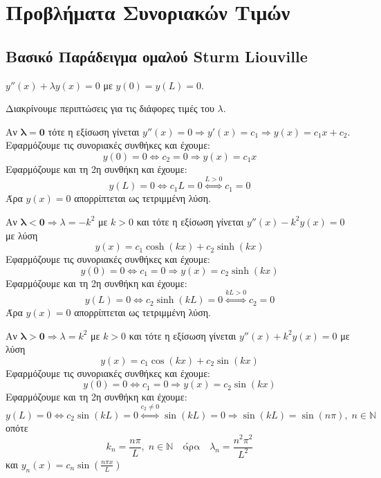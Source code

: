 



\geometry{top=1cm,margin=1cm}

\pagestyle{vangelis}
\everymath{\displaystyle}
\setcounter{chapter}{1}



\chapter*{Προβλήματα Συνοριακών Τιμών}

\section*{Βασικό Παράδειγμα ομαλού Sturm Liouville}


\begin{example}
  $ y''(x) + \lambda y(x)=0 $ με $ y(0)=y(L)=0 $.
\end{example}
\begin{solution}
  Διακρίνουμε περιπτώσεις για τις διάφορες τιμές του $ \lambda $.
  \begin{myitemize}
    \item Αν $ \bm{\lambda = 0} $ τότε η εξίσωση γίνεται 
      $ y''(x)=0 \Rightarrow y'(x) = c_{1} \Rightarrow y(x) = c_{1}x + c_{2} $. 
      Εφαρμόζουμε τις συνοριακές συνθήκες και έχουμε:
      \[
        y(0)=0 \Leftrightarrow c_{2}=0 \Rightarrow y(x) = c_{1}x 
      \] 
      Εφαρμόζουμε και τη 2η συνθήκη και έχουμε:
      \[
        y(L)=0 \Leftrightarrow c_{1}L=0 \overset{L>0}{\Leftrightarrow} c_{1}=0 
      \]
      Άρα $ y(x)=0 $ απορρίπτεται ως τετριμμένη λύση.
    \item Αν $ \bm{\lambda < 0} \Rightarrow \lambda = -k^{2} $ με $ k>0 $ και τότε η 
      εξίσωση γίνεται $ y''(x) -k^{2}y(x)=0$ με λύση 
      \[ 
        y(x) = c_{1} \cosh{(kx)} + c_{2} \sinh{(kx)} 
      \]
      Εφαρμόζουμε τις συνοριακές συνθήκες και έχουμε:
      \[
        y(0)=0 \Leftrightarrow c_{1}=0 \Rightarrow y(x) = c_{2} \sinh{(kx)}  
      \] 
      Εφαρμόζουμε και τη 2η συνθήκη και έχουμε:
      \[
        y(L)=0 \Leftrightarrow c_{2} \sinh{(kL)} = 0 \overset{kL>0}{\Leftrightarrow} 
        c_{2}=0 
      \]
      Άρα $ y(x)=0 $ απορρίπτεται ως τετριμμένη λύση.
    \item Αν $ \bm{\lambda > 0} \Rightarrow \lambda = k^{2} $ με $ k>0 $ και τότε η 
      εξίσωση γίνεται $ y''(x) +k^{2}y(x)=0$ με λύση 
      \[ 
        y(x) = c_{1} \cos{(kx)} + c_{2} \sin{(kx)} 
      \]
      Εφαρμόζουμε τις συνοριακές συνθήκες και έχουμε:
      \[
        y(0)=0 \Leftrightarrow c_{1}=0 \Rightarrow y(x) = c_{2} \sin{(kx)}  
      \] 
      Εφαρμόζουμε και τη 2η συνθήκη και έχουμε:
      \[
        y(L)=0 \Leftrightarrow c_{2} \sin{(kL)} = 0 \overset{c_{2} 
        \neq 0}{\Leftrightarrow} \sin{(kL)} =0 \Rightarrow \sin{(kL)} = \sin{(n \pi)}, \;
        n \in \mathbb{N} 
      \]
      οπότε 
      \[
        k_{n} = \frac{n \pi}{L} , \; n \in \mathbb{N} \quad \text{άρα} \quad 
        \lambda _{n} = \frac{n^{2} \pi ^{2}}{L^{2}} 
      \] 
      και $ y_{n}(x) = c_{n} \sin{\left(\frac{n \pi x}{L} \right)}  $ 
  \end{myitemize}
\end{solution}

